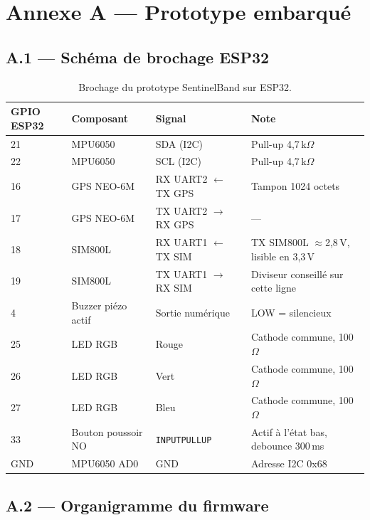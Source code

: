 \documentclass[12pt,a4paper]{article}
\renewcommand{\_}{\textunderscore\allowbreak}
\begin{document}
\newpage
\appendix

\section{Annexe A --- Prototype embarqué}
\label{ann:prototype}

\subsection*{A.1 --- Schéma de brochage ESP32}

\begin{table}[H]
\centering
\caption{Brochage du prototype SentinelBand sur ESP32.}
\small
\begin{tabular}{l l l l}
\toprule
\textbf{GPIO ESP32} & \textbf{Composant} & \textbf{Signal} & \textbf{Note} \\
\midrule
21 & MPU6050 & SDA (I2C) & Pull-up 4,7\,k$\Omega$ \\
22 & MPU6050 & SCL (I2C) & Pull-up 4,7\,k$\Omega$ \\
16 & GPS NEO-6M & RX UART2 $\leftarrow$ TX GPS & Tampon 1024 octets \\
17 & GPS NEO-6M & TX UART2 $\rightarrow$ RX GPS & --- \\
18 & SIM800L & RX UART1 $\leftarrow$ TX SIM & TX SIM800L $\approx$2,8\,V, lisible en 3,3\,V \\
19 & SIM800L & TX UART1 $\rightarrow$ RX SIM & Diviseur conseillé sur cette ligne \\
4 & Buzzer piézo actif & Sortie numérique & LOW = silencieux \\
25 & LED RGB & Rouge & Cathode commune, 100\,$\Omega$ \\
26 & LED RGB & Vert & Cathode commune, 100\,$\Omega$ \\
27 & LED RGB & Bleu & Cathode commune, 100\,$\Omega$ \\
33 & Bouton poussoir NO & \texttt{INPUT\_PULLUP} & Actif à l'état bas, debounce 300\,ms \\
GND & MPU6050 AD0 & GND & Adresse I2C 0x68 \\
\bottomrule
\end{tabular}
\end{table}

\subsection*{A.2 --- Organigramme du firmware}
\end{document}
